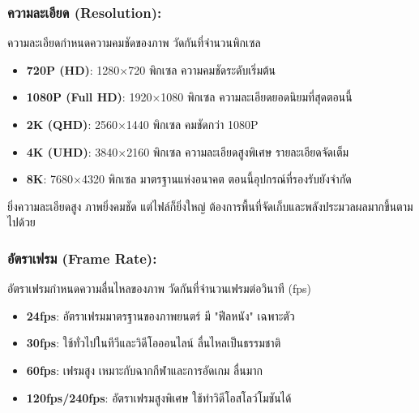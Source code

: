 


\subsubsection*{ความละเอียด (Resolution):}

ความละเอียดกำหนดความคมชัดของภาพ วัดกันที่จำนวนพิกเซล

\begin{itemize}
  \item \textbf{720P (HD)}: 1280×720 พิกเซล ความคมชัดระดับเริ่มต้น
  \item \textbf{1080P (Full HD)}: 1920×1080 พิกเซล ความละเอียดยอดนิยมที่สุดตอนนี้
  \item \textbf{2K (QHD)}: 2560×1440 พิกเซล คมชัดกว่า 1080P
  \item \textbf{4K (UHD)}: 3840×2160 พิกเซล ความละเอียดสูงพิเศษ รายละเอียดจัดเต็ม
  \item \textbf{8K}: 7680×4320 พิกเซล มาตรฐานแห่งอนาคต ตอนนี้อุปกรณ์ที่รองรับยังจำกัด
\end{itemize}

ยิ่งความละเอียดสูง ภาพยิ่งคมชัด แต่ไฟล์ก็ยิ่งใหญ่ ต้องการพื้นที่จัดเก็บและพลังประมวลผลมากขึ้นตามไปด้วย

\subsubsection*{อัตราเฟรม (Frame Rate):}

อัตราเฟรมกำหนดความลื่นไหลของภาพ วัดกันที่จำนวนเฟรมต่อวินาที (fps)

\begin{itemize}
  \item \textbf{24fps}: อัตราเฟรมมาตรฐานของภาพยนตร์ มี "ฟีลหนัง" เฉพาะตัว
  \item \textbf{30fps}: ใช้ทั่วไปในทีวีและวิดีโอออนไลน์ ลื่นไหลเป็นธรรมชาติ
  \item \textbf{60fps}: เฟรมสูง เหมาะกับฉากกีฬาและการอัดเกม ลื่นมาก
  \item \textbf{120fps/240fps}: อัตราเฟรมสูงพิเศษ ใช้ทำวิดีโอสโลว์โมชันได้
\end{itemize}

